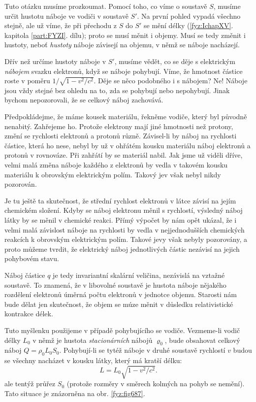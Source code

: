     Tuto otázku musíme prozkoumat. Pomocí toho, co víme o soustavě \(S\), musíme určit hustotu
    náboje ve vodiči v soustavě \(S'\). Na první pohled vypadá všechno stejně, ale už víme, že při
    přechodu z \(S\) do \(S'\) se mění délky (\ref{fyz:IchapXV}. kapitola \ref{part:FYZI}. dílu);
    proto se musí měnit i objemy. Musí se tedy změnit i hustoty, neboť \emph{hustoty} náboje
    závisejí na objemu, v němž se náboje nacházejí.

    Dřív než určíme hustoty náboje v \(S'\), musíme vědět, co se děje s elektrickým \emph{nábojem}
    svazku elektronů, když se náboje pohybují. Víme, že hmotnost částice roste v poměru \(1/\sqrt{1
    - v^2/c^2}\).  Děje se něco podobného i s nábojem? Ne! Náboje jsou vždy stejné bez ohledu na to,
    zda se pohybují nebo nepohybují. Jinak bychom nepozorovali, že se celkový náboj zachovává.

    Předpokládejme, že máme kousek materiálu, řekněme vodiče, který byl původně nenabitý. 
    Zahřejeme ho. Protože elektrony mají jiné hmotnosti než protony, změní se rychlosti elektronů a
    protonů různě. Závisel-li by náboj na rychlosti částice, která ho nese, nebyl by už v ohřátém
    kousku materiálu náboj elektronů a protonů v rovnováze. Při zahřátí by se materiál nabil. Jak
    jsme už viděli dříve, velmi malá změna náboje každého z elektronů by vedla v takovém kousku
    materiálu k obrovským elektrickým polím. Takový jev však nebyl nikdy pozorován.

    Je tu ještě ta skutečnost, že střední rychlost elektronů v látce závisí na jejím chemickém
    složení. Kdyby se náboj elektronu měnil s rychlostí, výsledný náboj látky by se měnil v chemické
    reakci. Přímý výpočet by nám opět ukázal, že i velmi malá závislost náboje na rychlosti by vedla
    v nejjednodušších chemických reakcích k obrovským elektrickým polím. Takové jevy však nebyly
    pozorovány, a proto můžeme tvrdit, že elektrický náboj jednotlivých částic nezávisí na jejich
    pohybovém stavu.

    Náboj částice \(q\) je tedy invariantní skalární veličina, nezávislá na vztažné soustavě. To
    znamená, že v libovolné soustavě je hustota náboje nějakého rozdělení elektronů úměrná počtu
    elektronů v jednotce objemu. Starosti nám bude dělat jen skutečnost, že objem se múze měnit v
    důsledku relativistické kontrakce délek.

    Tuto myšlenku použijeme v případě pohybujícího se vodiče. Vezmeme-li vodič délky \(L_0\) v němž
    je hustota \emph{stacionárních} nábojů \(\varrho_0\), bude obsahovat celkový náboj
    \(Q=ρ_0L_0S_0\). Pohybují-li se tytéž náboje v druhé soustavě rychlostí \(v\) budou se všechny
    nacházet v kousku látky, který má kratší délku:
    \begin{equation}\label{fyz:eq811}
      L=L_0\sqrt{1−v^2/c^2}.
    \end{equation}
    ale tentýž průřez \(S_0\) (protože rozměry v směrech kolmých na pohyb se nemění). Tato situace je
    znázorněna na obr. \ref{fyz:fig687}.

